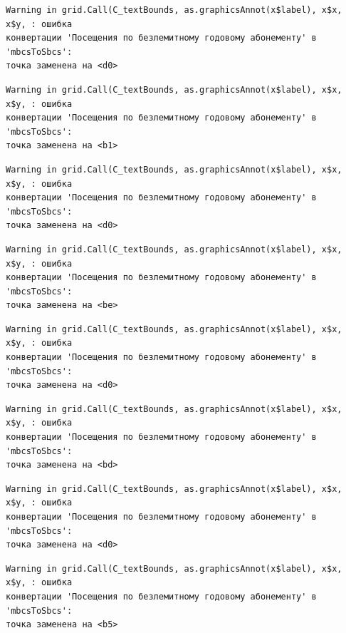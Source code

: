 \documentclass[
  letterpaper,
  DIV=11,
  numbers=noendperiod]{scrreprt}
\begin{document}
\begin{verbatim}
Warning in grid.Call(C_textBounds, as.graphicsAnnot(x$label), x$x, x$y, : ошибка
конвертации 'Посещения по безлемитному годовому абонементу' в 'mbcsToSbcs':
точка заменена на <d0>
\end{verbatim}

\begin{verbatim}
Warning in grid.Call(C_textBounds, as.graphicsAnnot(x$label), x$x, x$y, : ошибка
конвертации 'Посещения по безлемитному годовому абонементу' в 'mbcsToSbcs':
точка заменена на <b1>
\end{verbatim}

\begin{verbatim}
Warning in grid.Call(C_textBounds, as.graphicsAnnot(x$label), x$x, x$y, : ошибка
конвертации 'Посещения по безлемитному годовому абонементу' в 'mbcsToSbcs':
точка заменена на <d0>
\end{verbatim}

\begin{verbatim}
Warning in grid.Call(C_textBounds, as.graphicsAnnot(x$label), x$x, x$y, : ошибка
конвертации 'Посещения по безлемитному годовому абонементу' в 'mbcsToSbcs':
точка заменена на <be>
\end{verbatim}

\begin{verbatim}
Warning in grid.Call(C_textBounds, as.graphicsAnnot(x$label), x$x, x$y, : ошибка
конвертации 'Посещения по безлемитному годовому абонементу' в 'mbcsToSbcs':
точка заменена на <d0>
\end{verbatim}

\begin{verbatim}
Warning in grid.Call(C_textBounds, as.graphicsAnnot(x$label), x$x, x$y, : ошибка
конвертации 'Посещения по безлемитному годовому абонементу' в 'mbcsToSbcs':
точка заменена на <bd>
\end{verbatim}

\begin{verbatim}
Warning in grid.Call(C_textBounds, as.graphicsAnnot(x$label), x$x, x$y, : ошибка
конвертации 'Посещения по безлемитному годовому абонементу' в 'mbcsToSbcs':
точка заменена на <d0>
\end{verbatim}

\begin{verbatim}
Warning in grid.Call(C_textBounds, as.graphicsAnnot(x$label), x$x, x$y, : ошибка
конвертации 'Посещения по безлемитному годовому абонементу' в 'mbcsToSbcs':
точка заменена на <b5>
\end{verbatim}
\end{document}
